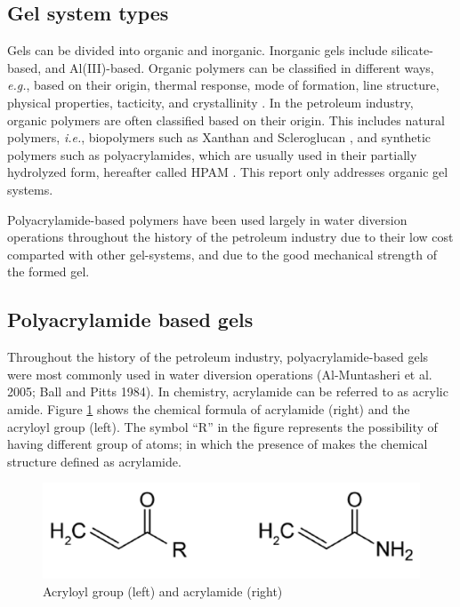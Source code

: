 \subsection{Gel system types}

Gels can be divided into organic and inorganic. Inorganic gels include silicate-based, and Al(III)-based. Organic polymers can be classified in different ways, \textit{e.g.}, based on their origin, thermal response, mode of formation, line structure, physical properties, tacticity, and crystallinity \citep{Ghosh2006}. In the petroleum industry, organic polymers are often classified based on their origin. This includes natural polymers, \textit{i.e.}, biopolymers such as Xanthan and Scleroglucan \citep{Al-Muntasheri2012}, and synthetic polymers such as polyacrylamides, which are usually used in their partially hydrolyzed form, hereafter called  HPAM \citep{Finch1992}. This report only addresses organic gel systems.

Polyacrylamide-based polymers have been used largely in water diversion operations throughout the history of the petroleum industry due to their low cost comparted with other gel-systems, and due to the good mechanical strength of the formed gel. 

\subsection{Polyacrylamide based gels \label{sec:PolyacrylamideGels}} 
Throughout the history of the petroleum industry, polyacrylamide-based gels were most commonly used in water diversion operations \citep{Al-Muntasheri2005, Ball1984} (Al-Muntasheri et al. 2005; Ball and Pitts 1984). In chemistry, acrylamide can be referred to as acrylic amide. Figure \ref{fig:acrylamide} shows the chemical formula of acrylamide (right) and the acryloyl group (left). The symbol “R” in the figure represents the possibility of having different group of atoms; in which the presence of  makes the chemical structure defined as acrylamide.

\begin{figure}
    \centering
    \includegraphics[width=\textwidth]{img/fig/acrylamide.png}
    \caption{Acryloyl group (left) and acrylamide (right)}
    \label{fig:acrylamide} %
\end{figure}

